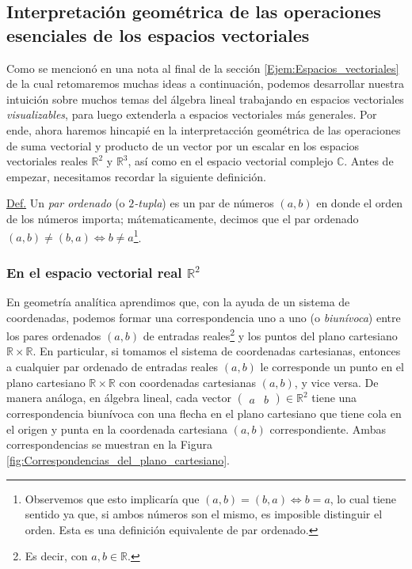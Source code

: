 \documentclass[12pt,dvipsnames]{article}
\begin{document}
\newpage
\subsection{Interpretación geométrica de las operaciones esenciales de los espacios vectoriales} \label{Subsec:Interpretación_geométrica_de_las_operaciones_de_los_espacios_vectoriales}

Como se mencionó en una nota al final de la sección \ref{Ejem:Espacios_vectoriales} \hspace{1.5mm}\textemdash de la cual retomaremos muchas ideas a continuación\textemdash, podemos desarrollar nuestra intuición sobre muchos temas del álgebra lineal trabajando en espacios vectoriales \emph{visualizables}, para luego extenderla a espacios vectoriales más generales. Por ende, ahora haremos hincapié en la interpretacción geométrica de las operaciones de suma vectorial y producto de un vector por un escalar en los espacios vectoriales reales $\mathbb{R}^2$ y $\mathbb{R}^3$, así como en el espacio vectorial complejo $\mathbb{C}$. Antes de empezar, necesitamos recordar la siguiente definición.

\vspace{1.5mm}

\begin{tcolorbox}
 \underline{Def.} Un \emph{par ordenado} (o \emph{$2$-tupla}) es un par de números $(a,b)$ en donde el orden de los números importa; mátematicamente, decimos que el par ordenado $(a,b)\neq (b,a)\iff b\neq a$\footnote{Observemos que esto implicaría que $(a,b)=(b,a)\iff b=a$, lo cual tiene sentido ya que, si ambos números son el mismo, es imposible distinguir el orden. Esta es una definición equivalente de par ordenado.}.
\end{tcolorbox}{}

\subsubsection{En el espacio vectorial real \texorpdfstring{$\mathbb{R}^2$}{TEXT}} \label{Ejem:En_R^2}

En geometría analítica aprendimos que, con la ayuda de un sistema de coordenadas, podemos formar una correspondencia uno a uno (o \emph{biunívoca}) entre los pares ordenados $(a,b)$ de entradas reales\footnote{Es decir, con $a,b\in\mathbb{R}$.} y los puntos del plano cartesiano $\mathbb{R}\times\mathbb{R}$. En particular, si tomamos el sistema de coordenadas cartesianas, entonces a cualquier par ordenado de entradas reales $(a,b)$ le corresponde un punto en el plano cartesiano $\mathbb{R}\times\mathbb{R}$ con coordenadas cartesianas $(a,b)$, y vice versa. De manera análoga, en álgebra lineal, cada vector $\begin{pmatrix}a&b\end{pmatrix} \in \mathbb{R}^2$ tiene una correspondencia biunívoca con una flecha en el plano cartesiano que tiene cola en el origen y punta en la coordenada cartesiana $(a,b)$ correspondiente. Ambas correspondencias se muestran en la Figura \ref{fig:Correspondencias_del_plano_cartesiano}.
\end{document}
